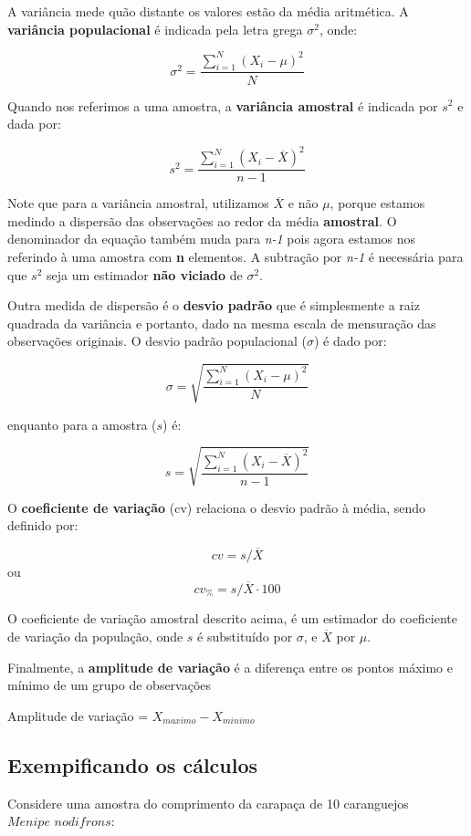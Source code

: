 \documentclass[
]{book}
\begin{document}
A variância mede quão distante os valores estão da média aritmética. A \textbf{variância populacional} é indicada pela letra grega \(\sigma^2\), onde:

\[\sigma^2=\frac{\sum_{i=1}^N{(X_i - \mu)^2}}{N}\]

Quando nos referimos a uma amostra, a \textbf{variância amostral} é indicada por \(s^2\) e dada por:

\[s^2=\frac{\sum_{i=1}^N{(X_i - \overline{X})^2}}{n-1}\]

Note que para a variância amostral, utilizamos \(\overline{X}\) e não \(\mu\), porque estamos medindo a dispersão das observações ao redor da média \textbf{amostral}. O denominador da equação também muda para \emph{n-1} pois agora estamos nos referindo à uma amostra com \textbf{n} elementos. A subtração por \emph{n-1} é necessária para que \(s^2\) seja um estimador \textbf{não viciado} de \(\sigma^2\).

Outra medida de dispersão é o \textbf{desvio padrão} que é simplesmente a raiz quadrada da variância e portanto, dado na mesma escala de mensuração das observações originais. O desvio padrão populacional (\(\sigma\)) é dado por:

\[\sigma=\sqrt{\frac{\sum_{i=1}^N{(X_i - \mu)^2}}{N}}\]

enquanto para a amostra (\(s\)) é:

\[s=\sqrt{\frac{\sum_{i=1}^N{(X_i - \overline{X})^2}}{n-1}}\]

O \textbf{coeficiente de variação} (cv) relaciona o desvio padrão à média, sendo definido por:

\[cv = s/\overline{X}\] ou \[cv_{\%}  = s/\overline{X}\cdot 100\]

O coeficiente de variação amostral descrito acima, é um estimador do coeficiente de variação da população, onde \(s\) é substituído por \(\sigma\), e \(\overline{X}\) por \(\mu\).

Finalmente, a \textbf{amplitude de variação} é a diferença entre os pontos máximo e mínimo de um grupo de observações

Amplitude de variação = \(X_{maximo} - X_{minimo}\)

\hypertarget{exempificando-os-cuxe1lculos}{%
\subsection{Exempificando os cálculos}\label{exempificando-os-cuxe1lculos}}

Considere uma amostra do comprimento da carapaça de 10 caranguejos \(\textit{Menipe nodifrons}\):
\end{document}
